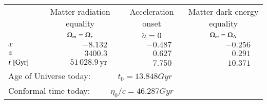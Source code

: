 \begin{tabular}{l rrr}
  \toprule
   \rule{0ex}{2ex} & \multicolumn{1}{c}{Matter-radiation equality} & \multicolumn{1}{c}{Acceleration onset} & \multicolumn{1}{c}{Matter-dark energy equality}  \\ [0.5ex]
    & \multicolumn{1}{c}{$\Omega_{m}=\Omega_{r}$} & \multicolumn{1}{c}{$\ddot{a}=0$} & \multicolumn{1}{c}{$\Omega_{m}=\Omega_{\Lambda}$}  \\ [0.5ex]
  \midrule
  \multicolumn{1}{l|}{\rule{0pt}{3ex}$x\quad$}              & $-8.132\quad$             & $-0.487\quad$ & $-0.256\quad$  \\ [0.5ex]
  \multicolumn{1}{l|}{\rule{0pt}{1ex}$z\quad$}              & $3400.3\quad$           & $0.627\quad$  & $0.291\quad$   \\ [0.5ex]
  \multicolumn{1}{l|}{\rule{0pt}{1ex}$t\,\,[\mathrm{Gyr}]\quad$} & $51\,028.9\,\mathrm{yr}\quad$ & $7.750\quad$  & $10.371\quad$  \\ [0.5ex]
  \midrule
  \midrule
  \multicolumn{4}{l}{\rule{0pt}{3ex} Age of Universe today: $\qquad\quad t_0=13.848\unit{Gyr}$} \\ 
  \multicolumn{4}{l}{\rule{0pt}{3ex} Conformal time today: $\qquad\, \eta_0 / c = 46.287\unit{Gyr}$} \\ [1ex]
  \bottomrule
  \end{tabular}
  